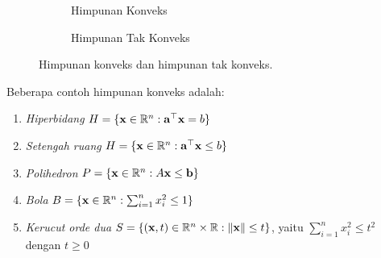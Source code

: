 \begin{figure}[h!]
  \begin{subfigure}[b]{0.45\textwidth}
    \centering
    \caption{Himpunan Konveks}
    \label{fig:convex-set-example}
  \end{subfigure}
  \begin{subfigure}[b]{0.45\textwidth}
    \centering
    \caption{Himpunan Tak Konveks}
    \label{fig:nonconvex-set-example}
  \end{subfigure}
\caption{Himpunan konveks dan himpunan tak konveks.}\label{fig:convex-nonconvex-examples}%
\end{figure}

Beberapa contoh himpunan konveks adalah:
\begin{enumerate}
    \item \emph{Hiperbidang}  $H = \{\mathbf{x} \in {\mathbb{R}}^n : \mathbf{a}^\top \mathbf{x} = b\}$
    \item \emph{Setengah ruang}   $H = \{ \mathbf{x} \in {\mathbb{R}}^n : \mathbf{a}^\top \mathbf{x} \leq b\}$
    \item \emph{Polihedron}  $P = \{\mathbf{x} \in {\mathbb{R}}^n : A\mathbf{x} \leq \mathbf{b}\}$
    \item \emph{Bola} $B = \{ \mathbf{x} \in {\mathbb{R}}^n : \sum_{i=1}^n x_i^2 \leq 1\}$
    \item \emph{Kerucut orde dua} $S = \{ (\mathbf{x},t) \in {\mathbb{R}}^n \times {\mathbb{R}} : \|\mathbf{x}\| \leq t \}$, yaitu $\sum_{i=1}^n x_i^2 \leq t^2$ dengan $t \geq 0$
\end{enumerate}

